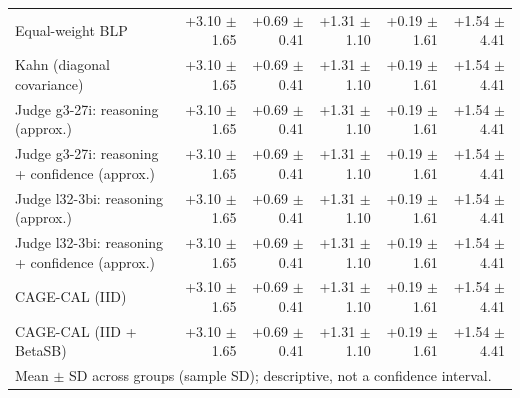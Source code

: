 \begin{tabular}{lrrrrr}
Equal-weight BLP & +3.10 {\scriptsize $\pm$ 1.65} & +0.69 {\scriptsize $\pm$ 0.41} & +1.31 {\scriptsize $\pm$ 1.10} & +0.19 {\scriptsize $\pm$ 1.61} & +1.54 {\scriptsize $\pm$ 4.41} \\
Kahn (diagonal covariance) & +3.10 {\scriptsize $\pm$ 1.65} & +0.69 {\scriptsize $\pm$ 0.41} & +1.31 {\scriptsize $\pm$ 1.10} & +0.19 {\scriptsize $\pm$ 1.61} & +1.54 {\scriptsize $\pm$ 4.41} \\
Judge g3-27i: reasoning (approx.) & +3.10 {\scriptsize $\pm$ 1.65} & +0.69 {\scriptsize $\pm$ 0.41} & +1.31 {\scriptsize $\pm$ 1.10} & +0.19 {\scriptsize $\pm$ 1.61} & +1.54 {\scriptsize $\pm$ 4.41} \\
Judge g3-27i: reasoning + confidence (approx.) & +3.10 {\scriptsize $\pm$ 1.65} & +0.69 {\scriptsize $\pm$ 0.41} & +1.31 {\scriptsize $\pm$ 1.10} & +0.19 {\scriptsize $\pm$ 1.61} & +1.54 {\scriptsize $\pm$ 4.41} \\
Judge l32-3bi: reasoning (approx.) & +3.10 {\scriptsize $\pm$ 1.65} & +0.69 {\scriptsize $\pm$ 0.41} & +1.31 {\scriptsize $\pm$ 1.10} & +0.19 {\scriptsize $\pm$ 1.61} & +1.54 {\scriptsize $\pm$ 4.41} \\
Judge l32-3bi: reasoning + confidence (approx.) & +3.10 {\scriptsize $\pm$ 1.65} & +0.69 {\scriptsize $\pm$ 0.41} & +1.31 {\scriptsize $\pm$ 1.10} & +0.19 {\scriptsize $\pm$ 1.61} & +1.54 {\scriptsize $\pm$ 4.41} \\
CAGE-CAL (IID) & +3.10 {\scriptsize $\pm$ 1.65} & +0.69 {\scriptsize $\pm$ 0.41} & +1.31 {\scriptsize $\pm$ 1.10} & +0.19 {\scriptsize $\pm$ 1.61} & +1.54 {\scriptsize $\pm$ 4.41} \\
CAGE-CAL (IID + BetaSB) & +3.10 {\scriptsize $\pm$ 1.65} & +0.69 {\scriptsize $\pm$ 0.41} & +1.31 {\scriptsize $\pm$ 1.10} & +0.19 {\scriptsize $\pm$ 1.61} & +1.54 {\scriptsize $\pm$ 4.41} \\
\bottomrule
\multicolumn{6}{l}{\scriptsize Mean $\pm$ SD across groups (sample SD); descriptive, not a confidence interval.} \\
\end{tabular}
